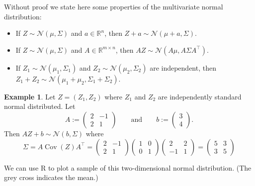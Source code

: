 \documentclass[
  a4paper,
]{article}
\theoremstyle{definition}
\theoremstyle{definition}
\newtheorem{example}{Example}[section]
\theoremstyle{definition}
\theoremstyle{definition}
\theoremstyle{remark}
\begin{document}
Without proof we state here some properties of the multivariate normal
distribution:

\begin{itemize}
\item
  If \(Z \sim \mathcal{N}(\mu, \Sigma)\) and \(a \in \mathbb{R}^n\), then
  \(Z + a \sim \mathcal{N}(\mu + a, \Sigma)\).
\item
  If \(Z \sim \mathcal{N}(\mu, \Sigma)\) and \(A \in \mathbb{R}^{m\times n}\), then
  \(AZ \sim \mathcal{N}(A\mu, A\Sigma A^\top)\).
\item
  If \(Z_1 \sim \mathcal{N}(\mu_1, \Sigma_1)\) and \(Z_2 \sim \mathcal{N}(\mu_2, \Sigma_2)\)
  are independent, then
  \(Z_1 + Z_2 \sim \mathcal{N}(\mu_1 + \mu_2, \Sigma_1 + \Sigma_2)\).
\end{itemize}

\begin{example}
Let \(Z = (Z_1, Z_2)\) where \(Z_1\) and \(Z_2\) are independently standard
normal distributed. Let
\begin{equation*}
  A := \begin{pmatrix}
    2 & -1 \\
    2 & 1
  \end{pmatrix}
  \qquad \mbox{and} \qquad
  b := \begin{pmatrix}
    3 \\ 4
  \end{pmatrix}.
\end{equation*}
Then \(AZ + b \sim \mathcal{N}(b, \Sigma)\) where
\begin{equation*}
  \Sigma
  = A \mathop{\mathrm{Cov}}(Z) A^\top
  = \begin{pmatrix}
      2 & -1 \\
      2 & 1
    \end{pmatrix}
    \begin{pmatrix}
      1 & 0 \\
      0 & 1
    \end{pmatrix}
    \begin{pmatrix}
      2 & 2 \\
      -1 & 1
    \end{pmatrix}
  = \begin{pmatrix}
      5 & 3 \\
      3 & 5
    \end{pmatrix}
\end{equation*}

We can use R to plot a sample of this two-dimensional normal distribution.
(The grey cross indicates the mean.)


\end{example}
\end{document}
